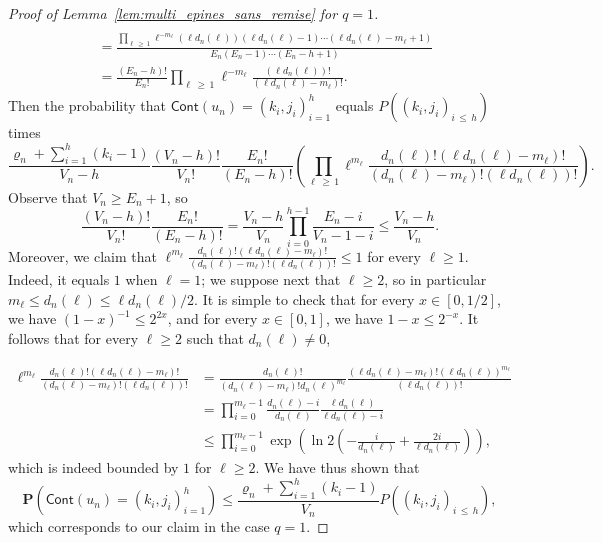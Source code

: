 \documentclass[10pt]{amsart}
\theoremstyle{definition}\newtheorem{defi}[theo]{Definition}\newtheorem{rema}[theo]{Remark}\newtheorem{exam}[theo]{Example}\newtheorem{exem}[theo]{Example}\newtheorem{nota}[theo]{Notation}
\newcommand{\ensembles}[1]{\mathbf{#1}}
\renewcommand{\P}{\ensembles{P}}
\renewcommand{\Pr}[1]{\P\left(#1\right)}
\newcommand{\1}{\ensembles{1}}
\renewcommand{\le}{\leqslant}
\renewcommand{\ge}{\geqslant}
\newcommand{\Cont}{\mathsf{Cont}}
\newcommand{\edges}{E}
\newcommand{\vertices}{V}
\providecommand{\?}{}
\begin{document}
\begin{proof}[Proof of Lemma~\ref{lem:multi_epines_sans_remise} for $q = 1$]
\begin{align*}
\\
&= \frac{\prod_{\ell\,\ge\,1} \ell^{- m_\ell} \left(\ell d_n(\ell)\right) \left(\ell d_n(\ell) - 1\right) \cdots \left(\ell d_n(\ell) - m_\ell + 1\right)}{\edges_n (\edges_n - 1) \cdots (\edges_n - h + 1)}
\\
&= \frac{(\edges_n - h)!}{\edges_n!} \prod_{\ell\,\ge\,1} \ell^{- m_\ell} \frac{\left(\ell d_n(\ell)\right)!}{\left(\ell d_n(\ell) - m_\ell\right)!}.
\end{align*}
Then the probability that $\Cont(u_n) = (k_i, j_i)_{i=1}^h$ equals $P((k_i, j_i)_{i\,\le\,h})$ times
\[
\frac{\varrho_n + \sum\limits_{i=1}^h (k_i - 1)}{\vertices_n-h} \frac{(\vertices_n-h)!}{\vertices_n!}
\frac{\edges_n!}{(\edges_n - h)!}
\left(\prod_{\ell\,\ge\,1} \ell^{m_\ell} \frac{d_n(\ell)! \left(\ell d_n(\ell) - m_\ell\right)!}{\left(d_n(\ell)-m_\ell\right)! \left(\ell d_n(\ell)\right)!}\right).
\]
Observe that $\vertices_n \ge \edges_n + 1$, so
\[
\frac{(\vertices_n-h)!}{\vertices_n!} \frac{\edges_n!}{(\edges_n - h)!} = \frac{\vertices_n-h}{\vertices_n} \prod_{i=0}^{h-1} \frac{\edges_n - i}{\vertices_n - 1 - i}
\le \frac{\vertices_n-h}{\vertices_n}.
\]
Moreover, we claim that $\ell^{m_\ell} \frac{d_n(\ell)! (\ell d_n(\ell) - m_\ell)!}{(d_n(\ell)-m_\ell)! (\ell d_n(\ell))!} \le 1$ for every $\ell \ge 1$. Indeed, it equals $1$ when $\ell=1$; we suppose next that $\ell \ge 2$, so in particular $m_\ell \le d_n(\ell) \le \ell d_n(\ell) / 2$. It is simple to check that for every $x \in [0, 1/2]$, we have $(1-x)^{-1} \le 2^{2x}$, and for every $x \in [0, 1]$, we have $1-x \le 2^{-x}$. It follows that for every $\ell \ge 2$ such that $d_n(\ell) \ne 0$,

\begin{align*}
\ell^{m_\ell} \frac{d_n(\ell)! \left(\ell d_n(\ell)-m_\ell\right)!}{\left(d_n(\ell)-m_\ell\right)! \left(\ell d_n(\ell)\right)!} &= \frac{d_n(\ell)!}{\left(d_n(\ell)-m_\ell\right)! d_n(\ell)^{m_\ell}} \frac{\left(\ell d_n(\ell)-m_\ell\right)! \left(\ell d_n(\ell)\right)^{m_\ell}}{\left(\ell d_n(\ell)\right)!}
\\
&= \prod_{i = 0}^{m_\ell-1} \frac{d_n(\ell) - i}{d_n(\ell)} \frac{\ell d_n(\ell)}{\ell d_n(\ell) - i}
\\
&\le \prod_{i = 0}^{m_\ell-1}
\exp\left(\ln 2 \left(-\frac{i}{d_n(\ell)} + \frac{2i}{\ell d_n(\ell)}\right)\right),
\end{align*}
which is indeed bounded by $1$ for $\ell \ge 2$. We have thus shown that
\[
\Pr{\Cont(u_n) = (k_i, j_i)_{i=1}^h} \le \frac{\varrho_n + \sum\limits_{i=1}^h \left(k_i - 1\right)}{\vertices_n} P\left((k_i, j_i)_{i\,\le\,h}\right),
\]
which corresponds to our claim in the case $q=1$.
\end{proof}
\end{document}
